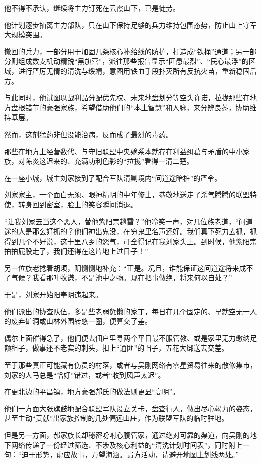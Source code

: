 他不得不承认，继续将主力钉死在云霞山下，已是徒劳。

他计划逐步抽离主力部队，只在山下保持足够的兵力维持包围态势，防止山上守军大规模突围。

撤回的兵力，一部分用于加固几条核心补给线的防护，打造成“铁桶”通道；另一部分则组成数支机动精锐“黑旗营”，派往那些报告显示“匪患最烈”、“民心最浮”的区域，进行严厉无情的清洗与绥靖，意图用铁血手段扑灭所有反抗火苗，重新稳固后方。

与此同时，他试图以战利品分配优先权、未来地盘划分等空头许诺，拉拢那些在地方盘根错节的豪强家族，希望借助他们的“本土智慧”和人脉，来分辨良莠，协助维持基层。

然而，这剂猛药非但没能治病，反而成了最烈的毒药。

\vspace{2em}

那些在地方上经营数代、与守旧联盟中央嫡系本就存在利益纠葛与矛盾的中小家族，对陈炎这迟来的、充满功利色彩的“拉拢”看得一清二楚。

在一座小城，城主刘家接到了配合军队清剿境内“问道途暗桩”的严令。

刘家家主，一个面白无须、眼神精明的中年修士，恭敬地送走了杀气腾腾的联盟特使，转身回到密室，脸上的笑容瞬间消退。

“让我刘家去当这个恶人，替他紫阳宗趟雷？”他冷笑一声，对几位族老道，“问道途的人是那么好抓的？他们神出鬼没，在穷鬼里名声还好。我们真下死力去抓，抓得到几个不好说，这十里八乡的怨气，可全得记在我刘家头上。到时候，他紫阳宗拍拍屁股走了，我们还得在这片地上过日子！”

另一位族老捻着胡须，阴恻恻地补充：“正是。况且，谁能保证这问道途将来成不了气候？我看那叶牧谦，不是池中之物。现在把事做绝，将来何以自处？”

于是，刘家开始阳奉阴违起来。

他们派出的协查队伍，多是些老弱惫懒的家丁，每日在几个固定的、早就空无一人的废弃矿洞或山林外围转悠一圈，便算交了差。

偶尔上面催得急了，他们便去佃户里寻两个平日最不服管教、或是家里无力缴纳足额租子，做事还不老实的刺头，扣上“通匪”的帽子，五花大绑送去交差。

至于那些真正可能藏有伤员的村落，或者与吴刚网络有零星贸易往来的散修集市，刘家的人马总是“恰好”错过，或者“收到风声太迟”。

在更北边的平昌镇，地方豪强郝氏的做法则更显“高明”。

他们一方面大张旗鼓地配合联盟军队设立关卡，盘查行人，做出尽心竭力的姿态，甚至主动“贡献”出家族控制的几处偏远山庄，作为联盟军队的临时驻地。

但是另一方面，郝家族长却秘密吩咐心腹管家，通过绝对可靠的渠道，向吴刚的地下网络传递了一份经过筛选、不涉及核心利益的“清洗计划时间表”，同时附上一句：“迫于形势，虚应故事，万望海涵。贵方活动，请避开地图上划线两处。”


